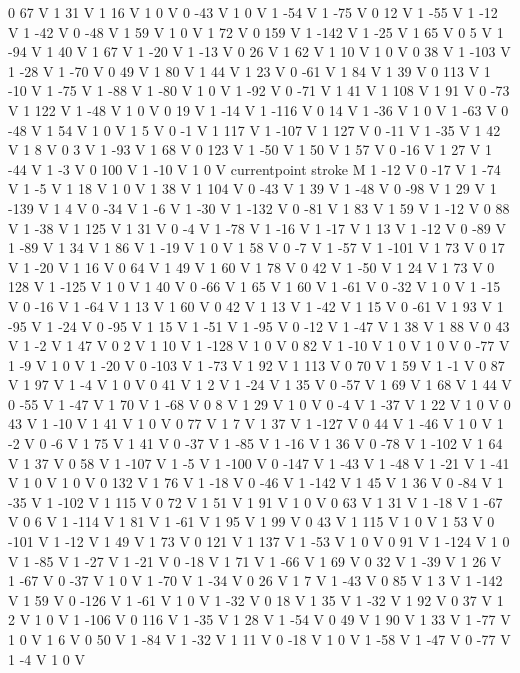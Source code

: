 {{0 67 V
1 31 V
1 16 V
1 0 V
0 -43 V
1 0 V
1 -54 V
1 -75 V
0 12 V
1 -55 V
1 -12 V
1 -42 V
0 -48 V
1 59 V
1 0 V
1 72 V
0 159 V
1 -142 V
1 -25 V
1 65 V
0 5 V
1 -94 V
1 40 V
1 67 V
1 -20 V
1 -13 V
0 26 V
1 62 V
1 10 V
1 0 V
0 38 V
1 -103 V
1 -28 V
1 -70 V
0 49 V
1 80 V
1 44 V
1 23 V
0 -61 V
1 84 V
1 39 V
0 113 V
1 -10 V
1 -75 V
1 -88 V
1 -80 V
1 0 V
1 -92 V
0 -71 V
1 41 V
1 108 V
1 91 V
0 -73 V
1 122 V
1 -48 V
1 0 V
0 19 V
1 -14 V
1 -116 V
0 14 V
1 -36 V
1 0 V
1 -63 V
0 -48 V
1 54 V
1 0 V
1 5 V
0 -1 V
1 117 V
1 -107 V
1 127 V
0 -11 V
1 -35 V
1 42 V
1 8 V
0 3 V
1 -93 V
1 68 V
0 123 V
1 -50 V
1 50 V
1 57 V
0 -16 V
1 27 V
1 -44 V
1 -3 V
0 100 V
1 -10 V
1 0 V
currentpoint stroke M
1 -12 V
0 -17 V
1 -74 V
1 -5 V
1 18 V
1 0 V
1 38 V
1 104 V
0 -43 V
1 39 V
1 -48 V
0 -98 V
1 29 V
1 -139 V
1 4 V
0 -34 V
1 -6 V
1 -30 V
1 -132 V
0 -81 V
1 83 V
1 59 V
1 -12 V
0 88 V
1 -38 V
1 125 V
1 31 V
0 -4 V
1 -78 V
1 -16 V
1 -17 V
1 13 V
1 -12 V
0 -89 V
1 -89 V
1 34 V
1 86 V
1 -19 V
1 0 V
1 58 V
0 -7 V
1 -57 V
1 -101 V
1 73 V
0 17 V
1 -20 V
1 16 V
0 64 V
1 49 V
1 60 V
1 78 V
0 42 V
1 -50 V
1 24 V
1 73 V
0 128 V
1 -125 V
1 0 V
1 40 V
0 -66 V
1 65 V
1 60 V
1 -61 V
0 -32 V
1 0 V
1 -15 V
0 -16 V
1 -64 V
1 13 V
1 60 V
0 42 V
1 13 V
1 -42 V
1 15 V
0 -61 V
1 93 V
1 -95 V
1 -24 V
0 -95 V
1 15 V
1 -51 V
1 -95 V
0 -12 V
1 -47 V
1 38 V
1 88 V
0 43 V
1 -2 V
1 47 V
0 2 V
1 10 V
1 -128 V
1 0 V
0 82 V
1 -10 V
1 0 V
1 0 V
0 -77 V
1 -9 V
1 0 V
1 -20 V
0 -103 V
1 -73 V
1 92 V
1 113 V
0 70 V
1 59 V
1 -1 V
0 87 V
1 97 V
1 -4 V
1 0 V
0 41 V
1 2 V
1 -24 V
1 35 V
0 -57 V
1 69 V
1 68 V
1 44 V
0 -55 V
1 -47 V
1 70 V
1 -68 V
0 8 V
1 29 V
1 0 V
0 -4 V
1 -37 V
1 22 V
1 0 V
0 43 V
1 -10 V
1 41 V
1 0 V
0 77 V
1 7 V
1 37 V
1 -127 V
0 44 V
1 -46 V
1 0 V
1 -2 V
0 -6 V
1 75 V
1 41 V
0 -37 V
1 -85 V
1 -16 V
1 36 V
0 -78 V
1 -102 V
1 64 V
1 37 V
0 58 V
1 -107 V
1 -5 V
1 -100 V
0 -147 V
1 -43 V
1 -48 V
1 -21 V
1 -41 V
1 0 V
1 0 V
0 132 V
1 76 V
1 -18 V
0 -46 V
1 -142 V
1 45 V
1 36 V
0 -84 V
1 -35 V
1 -102 V
1 115 V
0 72 V
1 51 V
1 91 V
1 0 V
0 63 V
1 31 V
1 -18 V
1 -67 V
0 6 V
1 -114 V
1 81 V
1 -61 V
1 95 V
1 99 V
0 43 V
1 115 V
1 0 V
1 53 V
0 -101 V
1 -12 V
1 49 V
1 73 V
0 121 V
1 137 V
1 -53 V
1 0 V
0 91 V
1 -124 V
1 0 V
1 -85 V
1 -27 V
1 -21 V
0 -18 V
1 71 V
1 -66 V
1 69 V
0 32 V
1 -39 V
1 26 V
1 -67 V
0 -37 V
1 0 V
1 -70 V
1 -34 V
0 26 V
1 7 V
1 -43 V
0 85 V
1 3 V
1 -142 V
1 59 V
0 -126 V
1 -61 V
1 0 V
1 -32 V
0 18 V
1 35 V
1 -32 V
1 92 V
0 37 V
1 2 V
1 0 V
1 -106 V
0 116 V
1 -35 V
1 28 V
1 -54 V
0 49 V
1 90 V
1 33 V
1 -77 V
1 0 V
1 6 V
0 50 V
1 -84 V
1 -32 V
1 11 V
0 -18 V
1 0 V
1 -58 V
1 -47 V
0 -77 V
1 -4 V
1 0 V
}}
